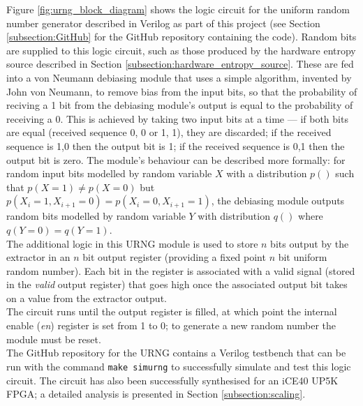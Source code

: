 \documentclass[12pt]{article}
\begin{document}
        Figure \ref{fig:urng_block_diagram} shows the logic circuit for the uniform random number generator described in Verilog as part of this project (see Section \ref{subsection:GitHub} for the GitHub repository containing the code). Random bits are supplied to this logic circuit, such as those produced by the hardware entropy source described in Section \ref{subsection:hardware_entropy_source}. These are fed into a von Neumann debiasing module that uses a simple algorithm, invented by John von Neumann, to remove bias from the input bits, so that the probability of reciving a 1 bit from the debiasing module's output is equal to the probability of receiving a 0. This is achieved by taking two input bits at a time --- if both bits are equal (received sequence 0, 0 or 1, 1), they are discarded; if the received sequence is 1,0 then the output bit is 1; if the received sequence is 0,1 then the output bit is zero. The module's behaviour can be described more formally: for random input bits modelled by random variable $X$ with a distribution $p()$ such that $p(X = 1) \neq p(X = 0)$ but $p(X_i = 1, X_{i+1} = 0) = p(X_i = 0,X_{i+1} = 1)$, the debiasing module outputs random bits modelled by random variable $Y$ with distribution $q()$ where $q(Y=0) = q(Y=1)$.\\

        The additional logic in this URNG module is used to store $n$ bits output by the extractor in an $n$ bit output register (providing a fixed point $n$ bit uniform random number). Each bit in the register is associated with a valid signal (stored in the \textit{valid} output register) that goes high once the associated output bit takes on a value from the extractor output.\\

        The circuit runs until the output register is filled, at which point the internal enable (\textit{en}) register is set from 1 to 0; to generate a new random number the module must be reset.\\

        The GitHub repository for the URNG contains a Verilog testbench that can be run with the command \texttt{make simurng} to successfully simulate and test this logic circuit. The circuit has also been successfully synthesised for an iCE40 UP5K FPGA; a detailed analysis is presented in Section \ref{subsection:scaling}.
\end{document}
